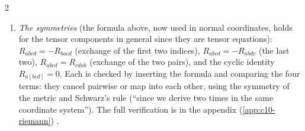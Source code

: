 \begin{paracol}{2}
\begin{enumerate}
  \item \emph{The symmetries} (the formula above, now used in normal coordinates, holds for the tensor components in general since they are tensor equations): $R_{abcd}=-R_{bacd}$ (exchange of the first two indices), $R_{abcd}=-R_{abdc}$ (the last two), $R_{abcd}=R_{cdab}$ (exchange of the two pairs), and the cyclic identity $R_{a[bcd]}=0$. Each is checked by inserting the formula and comparing the four terms: they cancel pairwise or map into each other, using the symmetry of the metric and Schwarz's rule (``since we derive two times in the same coordinate system''). The full verification is in the appendix (\cref{app:c10-riemann}) .
\end{enumerate}


\end{paracol}
